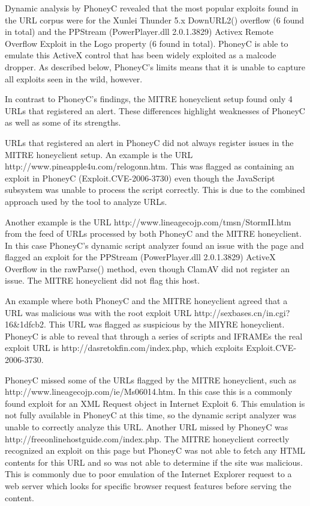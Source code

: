 \documentclass[10pt,twocolumn]{article}
\begin{document}
Dynamic analysis by PhoneyC revealed that the most popular exploits found in the URL corpus were for the Xunlei Thunder 5.x DownURL2() overflow (6 found in total) and the PPStream (PowerPlayer.dll 2.0.1.3829) Activex Remote Overflow Exploit in the Logo property (6 found in total). PhoneyC is able to emulate this ActiveX control that has been widely exploited as a malcode dropper. As described below, PhoneyC's limits means that it is unable to capture all exploits seen in the wild, however. 

In contrast to PhoneyC's findings, the MITRE honeyclient setup found only 4 URLs that registered an alert. These differences highlight weaknesses of PhoneyC as well as some of its strengths.

URLs that registered an alert in PhoneyC did not always register issues in the MITRE honeyclient setup. An example is the URL http://www.pineapple4u.com/relogonn.htm. This was flagged as containing an exploit in PhoneyC (Exploit.CVE-2006-3730) even though the JavaScript subsystem was unable to process the script correctly. This is due to the combined approach used by the tool to analyze URLs. 

Another example is the URL http://www.lineagecojp.com/tmsn/StormII.htm from the feed of URLs processed by both PhoneyC and the MITRE honeyclient. In this case PhoneyC's dynamic script analyzer found an issue with the page and flagged an exploit for the PPStream (PowerPlayer.dll 2.0.1.3829) ActiveX Overflow in the rawParse() method, even though ClamAV did not register an issue. The MITRE honeyclient did not flag this host. 

An example where both PhoneyC and the MITRE honeyclient agreed that a URL was malicious was with the root exploit URL http://sexbases.cn/in.cgi?16\&1dfcb2. This URL was flagged as suspicious by the MIYRE honeyclient. PhoneyC is able to reveal that through a series of scripts and IFRAMEs the real exploit URL is http://dasretokfin.com/index.php, which exploits Exploit.CVE-2006-3730. 

PhoneyC missed some of the URLs flagged by the MITRE honeyclient, such as http://www.lineagecojp.com/ie/Ms06014.htm. In this case this is a commonly found exploit for an XML Request object in Internet Exploit 6. This emulation is not fully available in PhoneyC at this time, so the dynamic script analyzer was unable to correctly analyze this URL. Another URL missed by PhoneyC was http://freeonlinehostguide.com/index.php. The MITRE honeyclient correctly recognized an exploit on this page but PhoneyC was not able to fetch any HTML contents for this URL and so was not able to determine if the site was malicious. This is commonly due to poor emulation of the Internet Explorer request to a web server which looks for specific browser request features before serving the content. 
\end{document}
